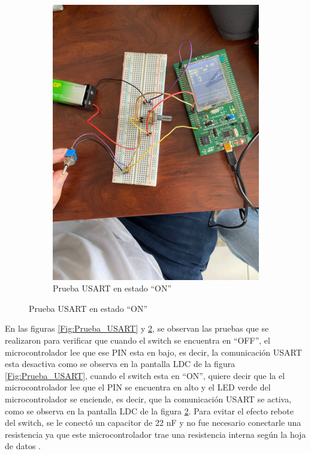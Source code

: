 \begin{figure}[H]
\begin{subfigure}{0.5\textwidth}
    \includegraphics[width=\textwidth]{Imagenes/Prueba_USART2.jpg} 
    \caption{Prueba USART en estado ``ON''}
    \label{Fig:Prueba_USART2}
\end{subfigure}
\end{figure}

En las figuras \ref{Fig:Prueba_USART} y \ref{Fig:Prueba_USART2}, se observan las pruebas que se realizaron para verificar que cuando el switch se encuentra en ``OFF'', el microcontrolador lee que ese PIN esta en bajo, es decir, la comunicación USART esta desactiva como se observa en la pantalla LDC de la figura \ref{Fig:Prueba_USART}, cuando el switch esta en ``ON'', quiere decir que la el microcontrolador lee que el PIN se encuentra en alto y el LED verde del microcontrolador se enciende, es decir, que la comunicación USART se activa, como se observa en la pantalla LDC de la figura \ref{Fig:Prueba_USART2}. Para evitar el efecto rebote del switch, se le conectó un capacitor de 22 nF y no fue necesario conectarle una resistencia ya que este microcontrolador trae una resistencia interna según la hoja de datos \cite{stm32micro, datasheet}. 

